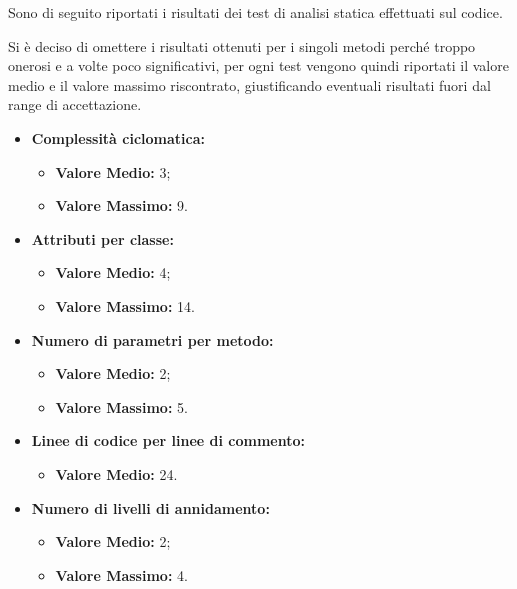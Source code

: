 Sono di seguito riportati i risultati dei test di analisi statica effettuati sul codice.

\noindent Si è deciso di omettere i risultati ottenuti per i singoli metodi perché troppo onerosi e a volte poco significativi, per ogni test vengono quindi riportati il valore medio e il valore massimo riscontrato, giustificando eventuali risultati fuori dal range di accettazione.

\begin{itemize}

	\item \textbf{Complessità ciclomatica:}
	\begin{itemize}
		\item \textbf{Valore Medio:} 3;
		\item \textbf{Valore Massimo:} 9.
	\end{itemize}



	\item \textbf{Attributi per classe:}
	\begin{itemize}
		\item \textbf{Valore Medio:} 4;
		\item \textbf{Valore Massimo:} 14.
	\end{itemize}



	\item \textbf{Numero di parametri per metodo:}
	\begin{itemize}
		\item \textbf{Valore Medio:} 2;
		\item \textbf{Valore Massimo:} 5.
	\end{itemize}



	\item \textbf{Linee di codice per linee di commento:}
	\begin{itemize}
		\item \textbf{Valore Medio:} 24.
	\end{itemize}



	\item \textbf{Numero di livelli di annidamento:}
	\begin{itemize}
		\item \textbf{Valore Medio:} 2;
		\item \textbf{Valore Massimo:} 4.
	\end{itemize}


\end{itemize}
